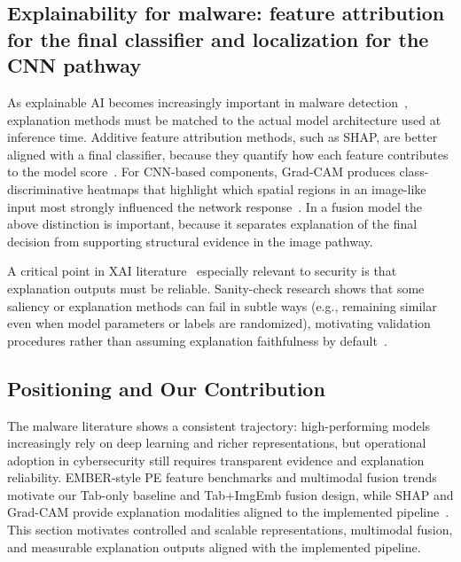 \documentclass[conference]{IEEEtran}
\begin{document}
\subsection{Explainability for malware: feature attribution for the final classifier and localization for the CNN pathway}

As explainable AI becomes increasingly important in malware detection~\cite{KBSSSK2025,NSDSP2025}, explanation methods must be matched to the actual model architecture used at inference time.
Additive feature attribution methods, such as SHAP, are better aligned with a final classifier, because they quantify how each feature contributes to the model score~\cite{LL2017}.
For CNN-based components, Grad-CAM produces class-discriminative heatmaps that highlight which spatial regions in an image-like input most strongly influenced the network response~\cite{SCDVPB2017}.
In a fusion model the above distinction is important, because it separates explanation of the final decision from supporting structural evidence in the image pathway.

A critical point in XAI literature~\cite{DJRLXSWB2020,NSDSP2025} especially relevant to security is that explanation outputs must be reliable.
Sanity-check research shows that some saliency or explanation methods can fail in subtle ways (e.g., remaining similar even when model parameters or labels are randomized), motivating validation procedures rather than assuming explanation faithfulness by default~\cite{JJMIMB2018}.

\subsection{Positioning and Our Contribution}

The malware literature shows a consistent trajectory: high-performing models increasingly rely on deep learning and richer representations, but operational adoption in cybersecurity still requires transparent evidence and explanation reliability.
EMBER-style PE feature benchmarks and multimodal fusion trends motivate our Tab-only baseline and Tab+ImgEmb fusion design, while SHAP and Grad-CAM provide explanation modalities aligned to the implemented pipeline~\cite{JMGPR2024,SZS25,SCDVPB2017,LL2017,HP20182018,NKJMB2011}.
This section motivates controlled and scalable representations, multimodal fusion, and measurable explanation outputs aligned with the implemented pipeline.
\end{document}
